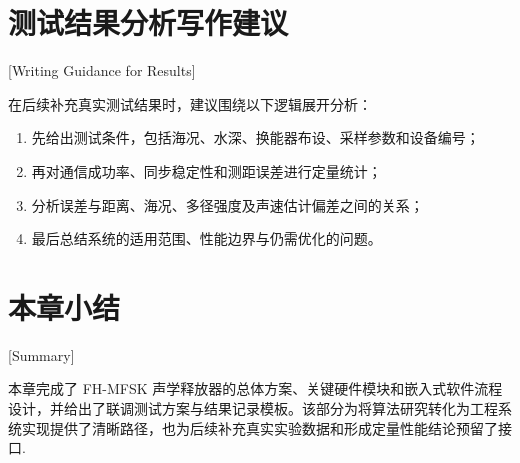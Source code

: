 \section{测试结果分析写作建议}[Writing Guidance for Results]

在后续补充真实测试结果时，建议围绕以下逻辑展开分析：

\begin{enumerate}
  \item 先给出测试条件，包括海况、水深、换能器布设、采样参数和设备编号；
  \item 再对通信成功率、同步稳定性和测距误差进行定量统计；
  \item 分析误差与距离、海况、多径强度及声速估计偏差之间的关系；
  \item 最后总结系统的适用范围、性能边界与仍需优化的问题。
\end{enumerate}

\section*{本章小结}[Summary]

本章完成了 FH-MFSK 声学释放器的总体方案、关键硬件模块和嵌入式软件流程设计，并给出了联调测试方案与结果记录模板。该部分为将算法研究转化为工程系统实现提供了清晰路径，也为后续补充真实实验数据和形成定量性能结论预留了接口.
